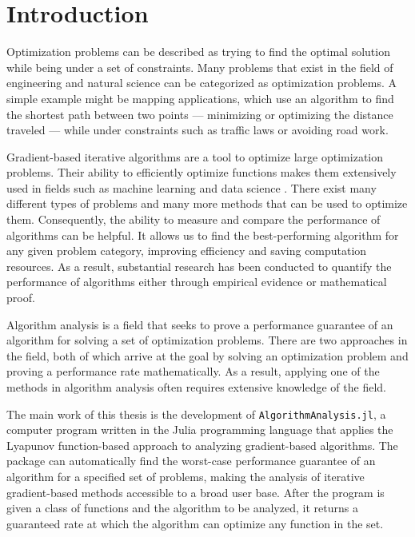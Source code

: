 \chapter{Introduction}

Optimization problems can be described as trying to find the optimal solution while being under a set of constraints. Many problems that exist in the field of engineering and natural science can be categorized as optimization problems. A simple example might be mapping applications, which use an algorithm to find the shortest path between two points --- minimizing or optimizing the distance traveled --- while under constraints such as traffic laws or avoiding road work.

Gradient-based iterative algorithms are a tool to optimize large optimization problems. Their ability to efficiently optimize functions makes them extensively used in fields such as machine learning and data science \cite{Wright_Recht_2022}. There exist many different types of problems and many more methods that can be used to optimize them. Consequently, the ability to measure and compare the performance of algorithms can be helpful. It allows us to find the best-performing algorithm for any given problem category, improving efficiency and saving computation resources. As a result, substantial research has been conducted to quantify the performance of algorithms either through empirical evidence or mathematical proof.

Algorithm analysis is a field that seeks to prove a performance guarantee of an algorithm for solving a set of optimization problems. There are two approaches in the field, both of which arrive at the goal by solving an optimization problem and proving a performance rate mathematically. As a result, applying one of the methods in algorithm analysis often requires extensive knowledge of the field.

The main work of this thesis is the development of \texttt{AlgorithmAnalysis.jl}, a computer program written in the Julia programming language that applies the Lyapunov function-based approach to analyzing gradient-based algorithms. The package can automatically find the worst-case performance guarantee of an algorithm for a specified set of problems, making the analysis of iterative gradient-based methods accessible to a broad user base. After the program is given a class of functions and the algorithm to be analyzed, it returns a guaranteed rate at which the algorithm can optimize any function in the set.

